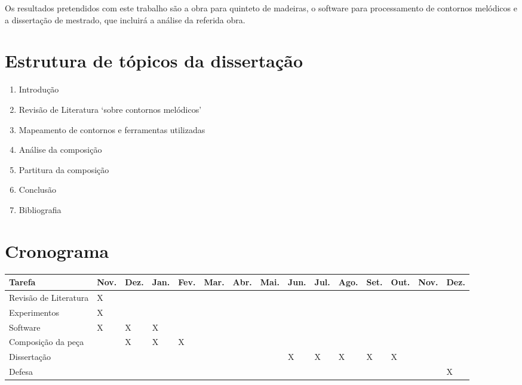 \documentclass{article}
\begin{document}
Os resultados pretendidos com este trabalho são a obra para quinteto
de madeiras, o software para processamento de contornos melódicos e a
dissertação de mestrado, que incluirá a análise da referida obra.

\section{Estrutura de tópicos da dissertação}
\label{sec:estrutura-de-topicos}

\begin{enumerate}
\item Introdução
\item Revisão de Literatura `sobre contornos melódicos'
\item Mapeamento de contornos e ferramentas utilizadas
\item Análise da composição
\item Partitura da composição
\item Conclusão
\item Bibliografia
\end{enumerate}

\section{Cronograma}
\label{sec:cronograma}

\begin{table}[h]
  \centering
  \begin{tabular}{lllllllllllllll}
    \hline
    Tarefa & Nov. & Dez. & Jan. & Fev. & Mar. & Abr. & Mai. & Jun. & Jul. & Ago. & Set. &
    Out. & Nov. & Dez. \\
    \hline
    Revisão de Literatura & X &  &  & & & & & & & & & & & \\
    Experimentos & X &  &  & & & & & & & & & & & \\
    Software & X & X & X & & & & & & & & & & & \\
    Composição da peça & & X & X & X & & & & & & & & & & \\
    Dissertação & & & & & & & & X & X & X & X & X & & \\
    Defesa & & & & & & & & & & & & & & X \\
    \hline


    \hline
  \end{tabular}
  \label{tab:cronograma}
\end{table}


\renewcommand{\refname}{Bibliografia}
\end{document}
